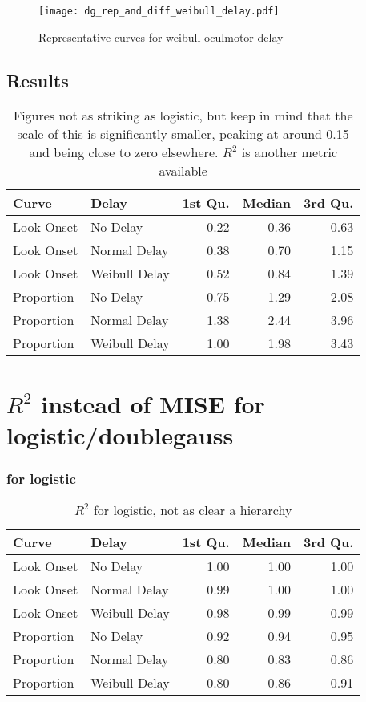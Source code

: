 \begin{figure}[H]
\centering
\texttt{[image: dg\_rep\_and\_diff\_weibull\_delay.pdf]}
\caption{Representative curves for weibull oculmotor delay}
\label{fig:dg_rep_curves_weibull_delay}
\end{figure}
\subsection{Results}

\begin{table}[ht]
\centering
\begin{tabular}{llrrr}
  \hline
Curve & Delay & 1st Qu. & Median & 3rd Qu. \\ 
  \hline
Look Onset & No Delay & 0.22 & 0.36 & 0.63 \\ 
  Look Onset & Normal Delay & 0.38 & 0.70 & 1.15 \\ 
  Look Onset & Weibull Delay & 0.52 & 0.84 & 1.39 \\ 
  Proportion & No Delay & 0.75 & 1.29 & 2.08 \\ 
  Proportion & Normal Delay & 1.38 & 2.44 & 3.96 \\ 
  Proportion & Weibull Delay & 1.00 & 1.98 & 3.43 \\ 
   \hline
\end{tabular}
\caption{Figures not as striking as logistic, but keep in mind that the scale of this is significantly smaller, peaking at around 0.15 and being close to zero elsewhere. $R^2$ is another metric available}
\label{tab:dg_mise_sims}
\end{table}

\section{$R^2$ instead of MISE for logistic/doublegauss}


\subsubsection{for logistic}

\begin{table}[H]
\centering
\begin{tabular}{llrrr}
  \hline
Curve & Delay & 1st Qu. & Median & 3rd Qu. \\ 
  \hline
Look Onset & No Delay & 1.00 & 1.00 & 1.00 \\ 
  Look Onset & Normal Delay & 0.99 & 1.00 & 1.00 \\ 
  Look Onset & Weibull Delay & 0.98 & 0.99 & 0.99 \\ 
  Proportion & No Delay & 0.92 & 0.94 & 0.95 \\ 
  Proportion & Normal Delay & 0.80 & 0.83 & 0.86 \\ 
  Proportion & Weibull Delay & 0.80 & 0.86 & 0.91 \\ 
   \hline
\end{tabular}
\caption{$R^2$ for logistic, not as clear a hierarchy}
\label{tab:r2_logistic_sims}
\end{table}

